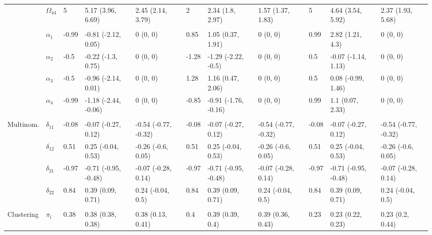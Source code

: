 \documentclass{article}
\begin{document}
\begin{landscape}
\begin{table}[t]
\begin{tabular}{lllllllllll}
\hspace{1em} & $\Omega_{44}$ & 5 & 5.17 (3.96, 6.69) & 2.45 (2.14, 3.79) & 2 & 2.34 (1.8, 2.97) & 1.57 (1.37, 1.83) & 5 & 4.64 (3.54, 5.92) & 2.37 (1.93, 5.68)\\
\addlinespace[0.3em]
\multicolumn{11}{l}{\textbf{ }}\\
\hspace{1em} & $\alpha_{1}$ & -0.99 & -0.81 (-2.12, 0.05) & 0 (0, 0) & 0.85 & 1.05 (0.37, 1.91) & 0 (0, 0) & 0.99 & 2.82 (1.21, 4.3) & 0 (0, 0)\\
\hspace{1em} & $\alpha_{2}$ & -0.5 & -0.22 (-1.3, 0.75) & 0 (0, 0) & -1.28 & -1.29 (-2.22, -0.5) & 0 (0, 0) & 0.5 & -0.07 (-1.14, 1.13) & 0 (0, 0)\\
\hspace{1em} & $\alpha_{3}$ & -0.5 & -0.96 (-2.14, 0.01) & 0 (0, 0) & 1.28 & 1.16 (0.47, 2.06) & 0 (0, 0) & 0.5 & 0.08 (-0.99, 1.46) & 0 (0, 0)\\
\hspace{1em} & $\alpha_{4}$ & -0.99 & -1.18 (-2.44, -0.06) & 0 (0, 0) & -0.85 & -0.91 (-1.76, -0.16) & 0 (0, 0) & 0.99 & 1.1 (0.07, 2.33) & 0 (0, 0)\\
\addlinespace[0.3em]
\multicolumn{11}{l}{\textbf{ }}\\
\hspace{1em}Multinom. & $\delta_{11}$ & -0.08 & -0.07 (-0.27, 0.12) & -0.54 (-0.77, -0.32) & -0.08 & -0.07 (-0.27, 0.12) & -0.54 (-0.77, -0.32) & -0.08 & -0.07 (-0.27, 0.12) & -0.54 (-0.77, -0.32)\\
\hspace{1em} & $\delta_{12}$ & 0.51 & 0.25 (-0.04, 0.53) & -0.26 (-0.6, 0.05) & 0.51 & 0.25 (-0.04, 0.53) & -0.26 (-0.6, 0.05) & 0.51 & 0.25 (-0.04, 0.53) & -0.26 (-0.6, 0.05)\\
\hspace{1em} & $\delta_{21}$ & -0.97 & -0.71 (-0.95, -0.48) & -0.07 (-0.28, 0.14) & -0.97 & -0.71 (-0.95, -0.48) & -0.07 (-0.28, 0.14) & -0.97 & -0.71 (-0.95, -0.48) & -0.07 (-0.28, 0.14)\\
\hspace{1em} & $\delta_{22}$ & 0.84 & 0.39 (0.09, 0.71) & 0.24 (-0.04, 0.5) & 0.84 & 0.39 (0.09, 0.71) & 0.24 (-0.04, 0.5) & 0.84 & 0.39 (0.09, 0.71) & 0.24 (-0.04, 0.5)\\
\addlinespace[0.3em]
\multicolumn{11}{l}{\textbf{ }}\\
\hspace{1em}Clustering & $\pi_l$ & 0.38 & 0.38 (0.38, 0.38) & 0.38 (0.13, 0.41) & 0.4 & 0.39 (0.39, 0.4) & 0.39 (0.36, 0.43) & 0.23 & 0.23 (0.22, 0.23) & 0.23 (0.2, 0.44)\\
\bottomrule
\end{tabular}
\end{table}
\end{landscape}
\end{document}
